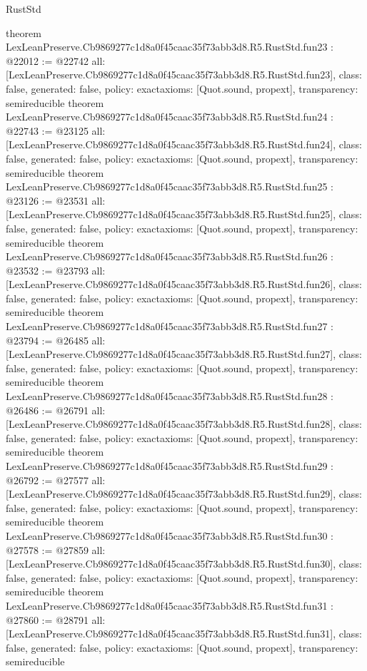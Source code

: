 \begin{lexlean}{RustStd}
\begin{coremodule}
{}
theorem LexLeanPreserve.Cb9869277c1d8a0f45caac35f73abb3d8.R5.RustStd.fun23 : @22012 := @22742 {
  all: [LexLeanPreserve.Cb9869277c1d8a0f45caac35f73abb3d8.R5.RustStd.fun23],
  class: false,
  generated: false,
  policy: exact{axioms: [Quot.sound, propext]},
  transparency: semireducible
}
theorem LexLeanPreserve.Cb9869277c1d8a0f45caac35f73abb3d8.R5.RustStd.fun24 : @22743 := @23125 {
  all: [LexLeanPreserve.Cb9869277c1d8a0f45caac35f73abb3d8.R5.RustStd.fun24],
  class: false,
  generated: false,
  policy: exact{axioms: [Quot.sound, propext]},
  transparency: semireducible
}
theorem LexLeanPreserve.Cb9869277c1d8a0f45caac35f73abb3d8.R5.RustStd.fun25 : @23126 := @23531 {
  all: [LexLeanPreserve.Cb9869277c1d8a0f45caac35f73abb3d8.R5.RustStd.fun25],
  class: false,
  generated: false,
  policy: exact{axioms: [Quot.sound, propext]},
  transparency: semireducible
}
theorem LexLeanPreserve.Cb9869277c1d8a0f45caac35f73abb3d8.R5.RustStd.fun26 : @23532 := @23793 {
  all: [LexLeanPreserve.Cb9869277c1d8a0f45caac35f73abb3d8.R5.RustStd.fun26],
  class: false,
  generated: false,
  policy: exact{axioms: [Quot.sound, propext]},
  transparency: semireducible
}
theorem LexLeanPreserve.Cb9869277c1d8a0f45caac35f73abb3d8.R5.RustStd.fun27 : @23794 := @26485 {
  all: [LexLeanPreserve.Cb9869277c1d8a0f45caac35f73abb3d8.R5.RustStd.fun27],
  class: false,
  generated: false,
  policy: exact{axioms: [Quot.sound, propext]},
  transparency: semireducible
}
theorem LexLeanPreserve.Cb9869277c1d8a0f45caac35f73abb3d8.R5.RustStd.fun28 : @26486 := @26791 {
  all: [LexLeanPreserve.Cb9869277c1d8a0f45caac35f73abb3d8.R5.RustStd.fun28],
  class: false,
  generated: false,
  policy: exact{axioms: [Quot.sound, propext]},
  transparency: semireducible
}
theorem LexLeanPreserve.Cb9869277c1d8a0f45caac35f73abb3d8.R5.RustStd.fun29 : @26792 := @27577 {
  all: [LexLeanPreserve.Cb9869277c1d8a0f45caac35f73abb3d8.R5.RustStd.fun29],
  class: false,
  generated: false,
  policy: exact{axioms: [Quot.sound, propext]},
  transparency: semireducible
}
theorem LexLeanPreserve.Cb9869277c1d8a0f45caac35f73abb3d8.R5.RustStd.fun30 : @27578 := @27859 {
  all: [LexLeanPreserve.Cb9869277c1d8a0f45caac35f73abb3d8.R5.RustStd.fun30],
  class: false,
  generated: false,
  policy: exact{axioms: [Quot.sound, propext]},
  transparency: semireducible
}
theorem LexLeanPreserve.Cb9869277c1d8a0f45caac35f73abb3d8.R5.RustStd.fun31 : @27860 := @28791 {
  all: [LexLeanPreserve.Cb9869277c1d8a0f45caac35f73abb3d8.R5.RustStd.fun31],
  class: false,
  generated: false,
  policy: exact{axioms: [Quot.sound, propext]},
  transparency: semireducible
}
\end{coremodule}
\end{lexlean}
